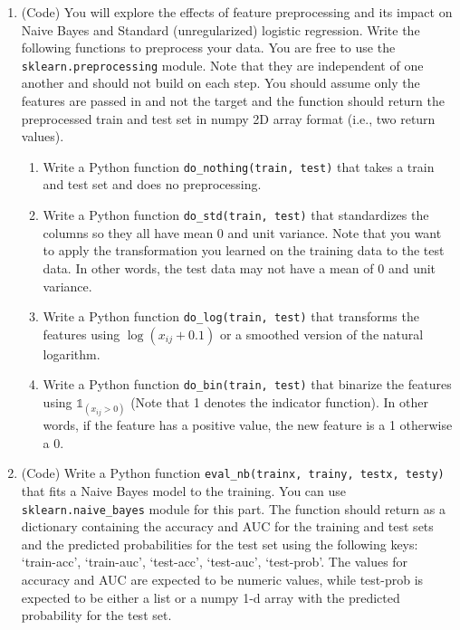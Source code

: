 \documentclass[a4paper,12pt]{article}
\begin{document}
\begin{enumerate}
    \begin{enumerate}
        \item[(a)] (Code) You will explore the effects of feature preprocessing and its impact on Naive Bayes and Standard (unregularized) logistic regression. Write the following functions to preprocess your data. You are free to use the \texttt{sklearn.preprocessing} module. Note that they are independent of one another and should not build on each step. You should assume only the features are passed in and not the target and the function should return the preprocessed train and test set in numpy 2D array format (i.e., two return values).
        \begin{enumerate}
            \item[i.] Write a Python function \texttt{do\_nothing(train, test)} that takes a train and test set and does no preprocessing.
            \item[ii.] Write a Python function \texttt{do\_std(train, test)} that standardizes the columns so they all have mean 0 and unit variance. Note that you want to apply the transformation you learned on the training data to the test data. In other words, the test data may not have a mean of 0 and unit variance.
            \item[iii.] Write a Python function \texttt{do\_log(train, test)} that transforms the features using $\log(x_{ij} + 0.1)$ or a smoothed version of the natural logarithm.
            \item[iv.] Write a Python function \texttt{do\_bin(train, test)} that binarize the features using $\mathbb{1}_{(x_{ij}>0)}$ (Note that 1 denotes the indicator function). In other words, if the feature has a positive value, the new feature is a 1 otherwise a 0.
        \end{enumerate}
        
        \item[(b)] (Code) Write a Python function \texttt{eval\_nb(trainx, trainy, testx, testy)} that fits a Naive Bayes model to the training. You can use \texttt{sklearn.naive\_bayes} module for this part. The function should return as a dictionary containing the accuracy and AUC for the training and test sets and the predicted probabilities for the test set using the following keys: `train-acc', `train-auc', `test-acc', `test-auc', `test-prob'. The values for accuracy and AUC are expected to be numeric values, while test-prob is expected to be either a list or a numpy 1-d array with the predicted probability for the test set.
        

\end{enumerate}
\end{enumerate}
\end{document}
